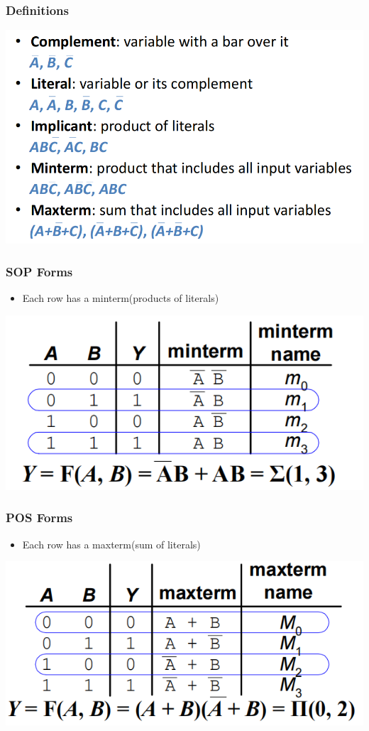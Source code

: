 \documentclass[12pt]{article}
\begin{document}
\subsubsection{Definitions}
\includegraphics[width=\textwidth]{SomeDefinitions.png}
\subsubsection{SOP Forms}
\begin{itemize}
    \item Each row has a minterm(products of literals)
\end{itemize}
\includegraphics[width=\textwidth]{SOPForm.png}
\subsubsection{POS Forms}
\begin{itemize}
    \item Each row has a maxterm(sum of literals)
\end{itemize}
\includegraphics[width=\textwidth]{POSForm.png}
\end{document}
